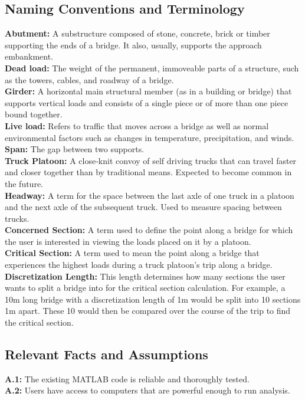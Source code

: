 \documentclass[12pt]{article}
\begin{document}
\subsection{Naming Conventions and Terminology}
\textbf{Abutment:} A substructure composed of stone, concrete, brick or timber supporting the ends of a bridge.
It also, usually, supports the approach embankment.\\
\textbf{Dead load:} The weight of the permanent, immoveable parts of a structure, such as the towers, cables, and roadway of a bridge.\\
\textbf{Girder:} A horizontal main structural member (as in a building or bridge) that supports vertical loads and  consists of a single piece or of more than one piece 
bound together.\\
\textbf{Live load:} Refers to traffic that moves across a bridge as well as normal environmental factors such as changes in temperature, precipitation, and winds.\\
\textbf{Span:} The gap between two supports.\\
\textbf{Truck Platoon:} A close-knit convoy of self driving trucks that can travel faster and closer together than by traditional means. Expected to become common 
in the future.\\
\textbf{Headway:} A term for the space between the last axle of one truck in a platoon and the next axle of the subsequent truck. Used to measure spacing between trucks.\\
\textbf{Concerned Section:} A term used to define the point along a bridge for which the user is interested in viewing the loads placed on it by a platoon.\\
\textbf{Critical Section:} A term used to mean the point along a bridge that experiences the highest loads during a truck platoon's trip along a bridge.\\
\textbf{Discretization Length:} This length determines how many sections the user wants to split a bridge into for the critical section calculation. For example,
a 10m long bridge with a discretization length of 1m would be split into 10 sections 1m apart. These 10 would then be compared over the course of the trip to find the 
critical section.\\  

\subsection{Relevant Facts and Assumptions}
\textbf{A.1:} The existing MATLAB code is reliable and thoroughly tested.\\
\textbf{A.2:} Users have access to computers that are powerful enough to run analysis.
\end{document}
